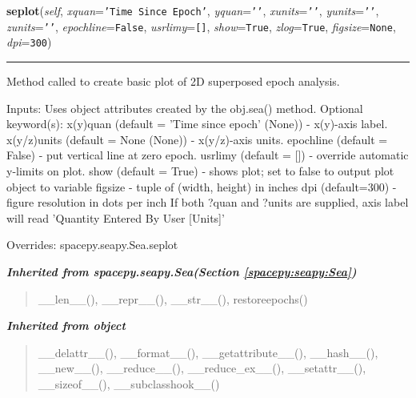 \hspace{.8\funcindent}\begin{boxedminipage}{\funcwidth}

    \raggedright \textbf{seplot}(\textit{self}, \textit{xquan}={\tt \texttt{'}\texttt{Time Since Epoch}\texttt{'}}, \textit{yquan}={\tt \texttt{'}\texttt{}\texttt{'}}, \textit{xunits}={\tt \texttt{'}\texttt{}\texttt{'}}, \textit{yunits}={\tt \texttt{'}\texttt{}\texttt{'}}, \textit{zunits}={\tt \texttt{'}\texttt{}\texttt{'}}, \textit{epochline}={\tt False}, \textit{usrlimy}={\tt \texttt{[}\texttt{]}}, \textit{show}={\tt True}, \textit{zlog}={\tt True}, \textit{figsize}={\tt None}, \textit{dpi}={\tt 300})

    \vspace{-1.5ex}

    \rule{\textwidth}{0.5\fboxrule}
\setlength{\parskip}{2ex}
    Method called to create basic plot of 2D superposed epoch analysis.

    Inputs: Uses object attributes created by the obj.sea() method. 
    Optional keyword(s): x(y)quan (default = 'Time since epoch' (None)) - 
    x(y)-axis label. x(y/z)units (default = None (None)) - x(y/z)-axis 
    units. epochline (default = False) - put vertical line at zero epoch. 
    usrlimy (default = []) - override automatic y-limits on plot. show 
    (default = True) - shows plot; set to false to output plot object to 
    variable figsize - tuple of (width, height) in inches dpi (default=300)
    - figure resolution in dots per inch If both ?quan and ?units are 
    supplied, axis label will read 'Quantity Entered By User [Units]'

\setlength{\parskip}{1ex}
      Overrides: spacepy.seapy.Sea.seplot

    \end{boxedminipage}


\large{\textbf{\textit{Inherited from spacepy.seapy.Sea\textit{(Section \ref{spacepy:seapy:Sea})}}}}

\begin{quote}
\_\_len\_\_(), \_\_repr\_\_(), \_\_str\_\_(), restoreepochs()
\end{quote}

\large{\textbf{\textit{Inherited from object}}}

\begin{quote}
\_\_delattr\_\_(), \_\_format\_\_(), \_\_getattribute\_\_(), \_\_hash\_\_(), \_\_new\_\_(), \_\_reduce\_\_(), \_\_reduce\_ex\_\_(), \_\_setattr\_\_(), \_\_sizeof\_\_(), \_\_subclasshook\_\_()
\end{quote}

